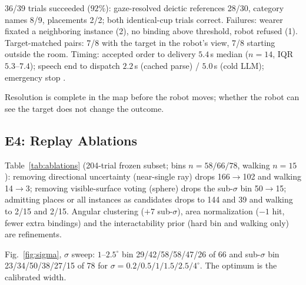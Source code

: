 36/39 trials succeeded ($92\%$): gaze-resolved deictic references
28/30, category names 8/9, placements 2/2; both identical-cup
trials correct. Failures: wearer fixated a neighboring instance
(2), no binding above threshold, robot refused (1). Target-matched
pairs: 7/8 with the target in the robot's view, 7/8 starting outside
the room. Timing: accepted order to delivery $5.4$\,s median
($n{=}14$, IQR $5.3$--$7.4$); speech end to dispatch $2.2$\,s
(cached parse) / $5.0$\,s (cold LLM); emergency stop .

Resolution is complete in the map before the robot moves; whether
the robot can see the target does not change the outcome.

\subsection{E4: Replay Ablations}
\label{sec:ablation_results}

Table~\ref{tab:ablations} (204-trial frozen subset; bins
$n=58/66/78$, walking $n=15$): removing directional uncertainty
(near-single ray) drops 166$\to$102 and walking 14$\to$3; removing
visible-surface voting (sphere) drops the sub-$\sigma$ bin 50$\to$15;
admitting places or all instances as candidates drops to 144 and 39
and walking to 2/15 and 2/15. Angular clustering ($+7$ sub-$\sigma$),
area normalization ($-1$ hit, fewer extra bindings) and the
interactability prior (hard bin and walking only) are refinements.

Fig.~\ref{fig:sigma}, $\sigma$ sweep: $1$--$2.5^\circ$ bin
29/42/58/58/47/26 of 66 and sub-$\sigma$ bin 23/34/50/38/27/15 of 78
for $\sigma=0.2/0.5/1/1.5/2.5/4^\circ$. The optimum is the calibrated
width.

